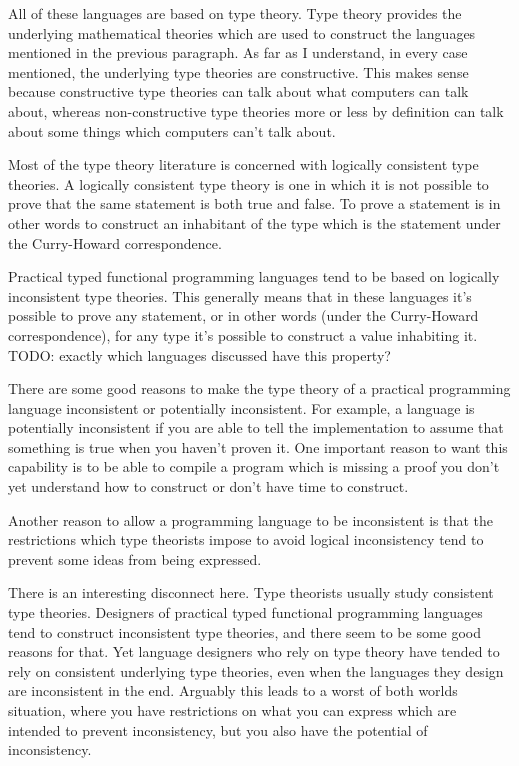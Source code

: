 \documentclass{article}
\begin{document}
All of these languages are based on type theory. Type theory provides the underlying mathematical theories which are used to construct the languages mentioned in the previous paragraph. As far as I understand, in every case mentioned, the underlying type theories are constructive. This makes sense because constructive type theories can talk about what computers can talk about, whereas non-constructive type theories more or less by definition can talk about some things which computers can't talk about.

Most of the type theory literature is concerned with logically consistent type theories. A logically consistent type theory is one in which it is not possible to prove that the same statement is both true and false. To prove a statement is in other words to construct an inhabitant of the type which is the statement under the Curry-Howard correspondence.

Practical typed functional programming languages tend to be based on logically inconsistent type theories. This generally means that in these languages it's possible to prove any statement, or in other words (under the Curry-Howard correspondence), for any type it's possible to construct a value inhabiting it. TODO: exactly which languages discussed have this property?

There are some good reasons to make the type theory of a practical programming language inconsistent or potentially inconsistent. For example, a language is potentially inconsistent if you are able to tell the implementation to assume that something is true when you haven't proven it. One important reason to want this capability is to be able to compile a program which is missing a proof you don't yet understand how to construct or don't have time to construct.

Another reason to allow a programming language to be inconsistent is that the restrictions which type theorists impose to avoid logical inconsistency tend to prevent some ideas from being expressed.

There is an interesting disconnect here. Type theorists usually study consistent type theories. Designers of practical typed functional programming languages tend to construct inconsistent type theories, and there seem to be some good reasons for that. Yet language designers who rely on type theory have tended to rely on consistent underlying type theories, even when the languages they design are inconsistent in the end. Arguably this leads to a worst of both worlds situation, where you have restrictions on what you can express which are intended to prevent inconsistency, but you also have the potential of inconsistency.
\end{document}
